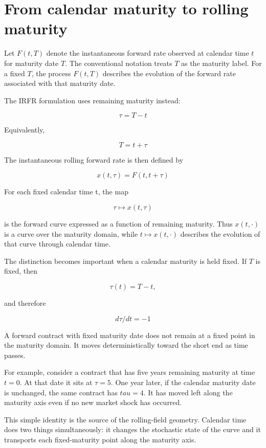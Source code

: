 \documentclass[11pt,oneside]{book}
\begin{document}
\section{From calendar maturity to rolling
maturity}\label{from-calendar-maturity-to-rolling-maturity}

Let \(F(t,T)\) denote the instantaneous forward rate observed at calendar
time \(t\) for maturity date \(T\). The conventional notation treats \(T\) as the
maturity label. For a fixed \(T\), the process \(F(t,T)\) describes the
evolution of the forward rate associated with that maturity date.

The IRFR formulation uses remaining maturity instead:

\[
\tau = T - t
\]

Equivalently,

\[
T = t + \tau
\]

The instantaneous rolling forward rate is then defined by

\[
x(t,\tau) = F(t,t+\tau)
\]

For each fixed calendar time t, the map

\[
\tau \mapsto x(t,\tau)
\]

is the forward curve expressed as a function of remaining maturity. Thus
\(x(t,\cdot)\) is a curve over the maturity domain, while \(t \mapsto x(t,\cdot)\) describes
the evolution of that curve through calendar time.

The distinction becomes important when a calendar maturity is held
fixed. If \(T\) is fixed, then

\[
\tau(t) = T - t,
\]

and therefore

\[
d\tau/dt = -1
\]

A forward contract with fixed maturity date does not remain at a fixed
point in the maturity domain. It moves deterministically toward the
short end as time passes.

For example, consider a contract that has five years remaining maturity
at time \(t=0\). At that date it sits at \(\tau=5\). One year later, if the
calendar maturity date is unchanged, the same contract has \(tau=4\). It has
moved left along the maturity axis even if no new market shock has
occurred.

This simple identity is the source of the rolling-field geometry.
Calendar time does two things simultaneously: it changes the stochastic
state of the curve and it transports each fixed-maturity point along the
maturity axis.
\end{document}
